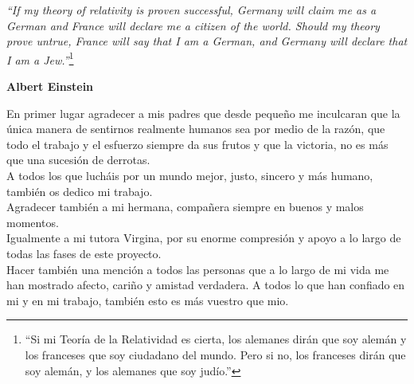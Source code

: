 
\begin{flushright}
\textit{``If my theory of relativity is proven successful, Germany will claim me
as a German and France will declare me a citizen of the world. Should my theory
prove untrue, France will say that I am a German, and Germany will declare that
I am a Jew.''}\footnote{``Si mi Teoría de la Relatividad es cierta, los alemanes
dirán que soy alemán y los franceses que soy ciudadano del mundo. Pero si no,
los franceses dirán que soy alemán, y los alemanes que soy judío.''}
\end{flushright}
\begin{flushright}
\textbf{Albert Einstein}
\end{flushright}

En primer lugar agradecer a mis padres que desde pequeño me inculcaran que la única manera de sentirnos realmente humanos sea por medio de la razón, que todo el trabajo y el esfuerzo siempre da sus frutos y que la victoria, no es más que una sucesión de derrotas.
\\

A todos los que lucháis por un mundo mejor, justo, sincero y más humano, también os dedico mi trabajo.
\\

Agradecer también a mi hermana, compañera siempre en buenos y malos momentos. 
\\

Igualmente a mi tutora Virgina, por su enorme compresión y apoyo a lo largo de todas las fases de este proyecto.
\\

Hacer también una mención a todos las personas que a lo largo de mi vida me han mostrado afecto, cariño y amistad verdadera. A todos lo que han confiado en mi y en mi trabajo, también esto es más vuestro que mio.